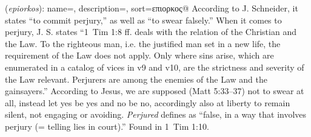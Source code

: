 \item[Perjured,]

(\textit{epiorkos}):
{
    name=,
    description={},
    sort=επιορκος@
}
According to J. Schneider, it states ``to commit perjury,'' as well as ``to swear falsely.'' When it comes to perjury, J. S. states ``1~Tim 1:8 ff. deals with the relation of the Christian and the Law. To the righteous man, i.e. the justified man set in a new life, the requirement of the Law does not apply. Only where sins arise, which are enumerated in a catalog of vices in v9 and v10, are the strictness and severity of the Law relevant. Perjurers are among the enemies of the Law and the gainsayers.'' 
According to Jesus, we are supposed (Matt 5:33--37) not to swear at all, instead let yes be yes and no be no, accordingly also at liberty to remain silent, not engaging or avoiding. \emph{Perjured} defines as ``false, in a way that involves perjury (= telling lies in court).''
Found in 1~Tim 1:10.
